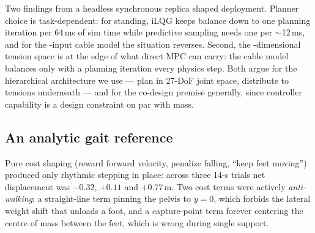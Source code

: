 \documentclass[conference]{IEEEtran}
\begin{document}
Two findings from a headless synchronous replica shaped deployment. Planner
choice is task-dependent: for standing, iLQG keeps balance down to one
planning iteration per 64\,ms of sim time while predictive sampling needs one
per $\sim$12\,ms, and for the \numActuatable-input cable model the situation
reverses. Second, the \numActuatable-dimensional tension space is at the edge
of what direct MPC can carry: the cable model balances only with a planning
iteration every physics step. Both argue for the hierarchical architecture we
use --- plan in 27-DoF joint space, distribute to tensions underneath --- and
for the co-design premise generally, since controller capability is a design
constraint on par with mass.

\subsection{An analytic gait reference}
\label{sec:gait}
Pure cost shaping (reward forward velocity, penalize falling, ``keep feet
moving'') produced only rhythmic stepping in place: across three 14-s trials
net displacement was $-0.32$, $+0.11$ and $+0.77$\,m. Two cost terms were
actively \emph{anti-walking}: a straight-line term pinning the pelvis to
$y=0$, which forbids the lateral weight shift that unloads a foot, and a
capture-point term forever centering the centre of mass between the feet,
which is wrong during single support.
\end{document}
